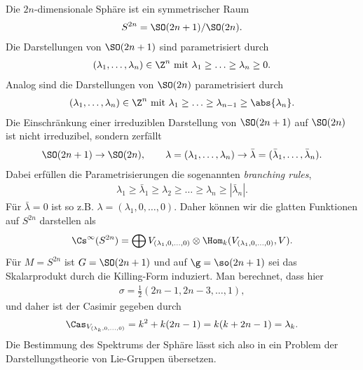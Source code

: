 \documentclass[%
	paper=a5,%
	fleqn,%
	DIV=18,%
	BCOR=0mm,
	fontsize=11pt,
	titlepage=false,%
	bibliography=totoc,
	DIV=18,%
	twoside=true,
	pdftitle=Riemannsche Geometrie,
	pdfauthor=Uwe Semmelmann,
	numbers=noendperiod]%
	{scrbook}
\begin{document}
\begin{ex}
Die $2n$-dimensionale Sphäre ist ein symmetrischer Raum
\begin{align*}
S^{2n} = \SO(2n+1)/\SO(2n).
\end{align*}
Die Darstellungen von $\SO(2n+1)$ sind parametrisiert durch
\begin{align*}
(\lambda_{1},\ldots,\lambda_{n})\in\Z^n \text{ mit } \lambda_{1}\ge \ldots\ge \lambda_{n}\ge 0.
\end{align*}
Analog sind die Darstellungen von $\SO(2n)$ parametrisiert durch
\begin{align*}
(\lambda_{1},\ldots,\lambda_{n})\in\Z^n \text{ mit } \lambda_{1}\ge \ldots\ge \lambda_{n-1} \ge \abs{\lambda_{n}}.
\end{align*}
Die Einschränkung einer irreduziblen Darstellung von $\SO(2n+1)$ auf $\SO(2n)$ ist nicht irreduzibel, sondern zerfällt
\begin{align*}
\SO(2n+1)\to \SO(2n),\qquad \lambda=(\lambda_{1},\ldots,\lambda_{n})\to \bar\lambda=(\bar\lambda_{1},\ldots,\bar\lambda_{n}).
\end{align*}
Dabei erfüllen die Parametrisierungen die sogenannten \textit{branching rules},
\begin{align*}
\lambda_{1}\ge \bar\lambda_{1}\ge \lambda_{2} \ge \ldots \ge \lambda_{n} \ge|\bar\lambda_{n}|.
\end{align*}
Für $\bar{\lambda}=0$ ist so z.B. $\lambda=(\lambda_{1},0,\ldots,0)$. Daher können wir die glatten Funktionen auf $S^{2n}$ darstellen als
\begin{align*}
\Cs^\infty(S^{2n}) = \bigoplus V_{(\lambda_{1},0,\ldots,0)}\otimes \Hom_{k}(V_{(\lambda_{1},0,\ldots,0)},V).
\end{align*}
Für $M=S^{2n}$ ist $G=\SO(2n+1)$ und auf $\g=\so(2n+1)$ sei das Skalarprodukt durch die Killing-Form induziert. Man berechnet, dass hier
\begin{align*}
\sigma = \frac{1}{2}(2n-1,2n-3,\ldots,1),
\end{align*}
und daher ist der Casimir gegeben durch
\begin{align*}
\Cas_{V_{(\lambda_{k},0,\ldots,0)}} = k^2+k(2n-1) = k(k+2n-1) = \lambda_{k}.
\end{align*}
Die Bestimmung des Spektrums der Sphäre lässt sich also in ein Problem der Darstellungstheorie von Lie-Gruppen übersetzen.\boxc
\end{ex}



\end{document}
